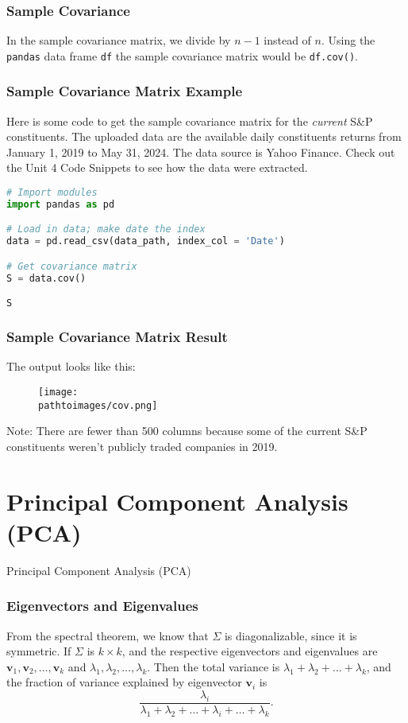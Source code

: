 \documentclass{beamer}
\newcommand{\pathtoimages}{/Users/charlesrambo/Desktop/Bootcamp24/Images}
\begin{document}
\begin{frame}
\frametitle{Sample Covariance}
In the sample covariance matrix, we divide by $n-1$ instead of $n$. Using the \texttt{pandas} data frame \texttt{df} the sample covariance matrix would be  \texttt{df.cov()}.

\end{frame}

\begin{frame}[fragile]
\frametitle{Sample Covariance Matrix Example}
\small 
Here is some code to get the sample covariance matrix for the {\it current} S\&P constituents. The uploaded data are the available daily constituents returns from January 1, 2019 to May 31, 2024. The data source is Yahoo Finance. Check out the Unit 4 Code Snippets to see how the data were extracted.
\begin{lstlisting}[language=Python]
# Import modules
import pandas as pd

# Load in data; make date the index
data = pd.read_csv(data_path, index_col = 'Date')

# Get covariance matrix
S = data.cov()

S
\end{lstlisting}


\end{frame}

\begin{frame}
\frametitle{Sample Covariance Matrix Result}
The output looks like this:
\begin{figure}
\centering
\texttt{[image: \\pathtoimages/cov.png]}
\end{figure}
Note: There are fewer than 500 columns because some of the current S\&P constituents weren't publicly traded companies in 2019.
\end{frame}

\section{Principal Component Analysis (PCA)}


\begin{frame}
\begin{center}
\Huge Principal Component Analysis (PCA)
\end{center}
\end{frame}


\begin{frame}
\frametitle{Eigenvectors and Eigenvalues}
From the spectral theorem, we know that $\Sigma$ is diagonalizable, since it is symmetric. If $\Sigma$ is $k\times k$, and the respective eigenvectors and eigenvalues are ${\boldsymbol v_1}, {\boldsymbol v_2},\ldots, {\boldsymbol v_k}$ and $\lambda_1, \lambda_2,\ldots, \lambda_k$. Then the total variance is $\lambda_1 + \lambda_2+\ldots+\lambda_k$, and the fraction of variance explained by eigenvector ${\boldsymbol v_i}$ is
$$
\frac{\lambda_i}{\lambda_1 +\lambda_2+\ldots+\lambda_i+\ldots+\lambda_k}.
$$
\end{frame}
\end{document}
